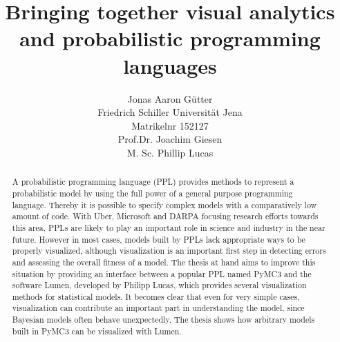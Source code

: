 \documentclass{article}
\title{Bringing together visual analytics and probabilistic programming languages}
\author{Jonas Aaron Gütter  \\
	Friedrich Schiller Universität Jena  \\
    Matrikelnr 152127 \\
    Prof.Dr. Joachim Giesen \\
    M. Sc. Phillip Lucas
	}
\begin{document}
\maketitle

\begin{abstract}
A probabilistic programming language (PPL) provides methods to represent a probabilistic model by using the full power of a general purpose programming language. Thereby it is possible to specify complex models with a comparatively low amount of code. With Uber, Microsoft and DARPA focusing research efforts towards this area, PPLs are likely to play an important role in science and industry in the near future.
However in most cases, models built by PPLs lack appropriate ways to be properly visualized, although visualization is an important first step in detecting errors and assessing the overall fitness of a model. The thesis at hand aims to improve this situation by providing an interface between a popular PPL named PyMC3 and the software Lumen, developed by Philipp Lucas, which provides several visualization methods for statistical models. It becomes clear that even for very simple cases, visualization can contribute an important part in understanding the model, since Bayesian models often behave unexpectedly. The thesis shows how arbitrary models built in PyMC3 can be visualized with Lumen. 
\end{abstract}

\tableofcontents


\printglossaries
\end{document}
